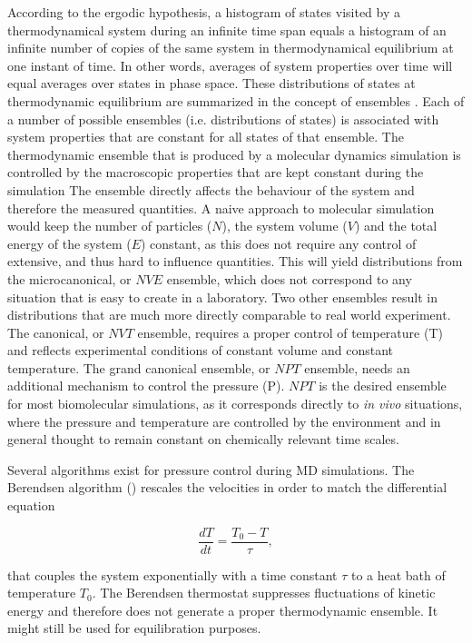 \documentclass[english, a4paper, 12pt, titlepage, draft]{article}
\begin{document}
According to the ergodic hypothesis, a histogram of states visited by a thermodynamical system during an infinite time span equals a histogram of an infinite number of copies of the same system in thermodynamical equilibrium at one instant of time.
In other words, averages of system properties over time will equal averages over states in phase space.
These distributions of states at thermodynamic equilibrium are summarized in the concept of ensembles \cite{Atkins}. 
Each of a number of possible ensembles (i.e. distributions of states) is associated with system properties that are constant for all states of that ensemble.
The thermodynamic ensemble that is produced by a molecular dynamics simulation is controlled by the macroscopic properties that are kept constant during the simulation
The ensemble directly affects the behaviour of the system and therefore the measured quantities.
A naive approach to molecular simulation would keep the number of particles ($N$), the system volume ($V$) and the total energy of the system ($E$) constant, as this does not require any control of extensive, and thus hard to influence quantities.
This will yield distributions from the microcanonical, or $NVE$ ensemble, which does not correspond to any situation that is easy to create in a laboratory.
Two other ensembles result in distributions that are much more directly comparable to real world experiment.
The canonical, or $NVT$ ensemble, requires a proper control of temperature (T) and reflects experimental conditions of constant volume and constant temperature.
The grand canonical ensemble, or $NPT$ ensemble, needs an additional mechanism to control the pressure (P).
$NPT$ is the desired ensemble for most biomolecular simulations, as it corresponds directly to \textit{in vivo} situations, where the pressure and temperature are controlled by the environment and in general thought to remain constant on chemically relevant time scales.

Several algorithms exist for pressure control during MD simulations.
The Berendsen algorithm (\cite{BerendsenTempControl}) rescales the velocities in order to match the differential equation

\begin{equation}
    \frac{dT}{dt} = \frac{T_0 - T}{\tau},
\end{equation}

that couples the system exponentially with a time constant $\tau$ to a heat bath of temperature $T_0$.
The Berendsen thermostat suppresses fluctuations of kinetic energy and therefore does not generate a proper thermodynamic ensemble. It might still be used for equilibration purposes.
\end{document}
